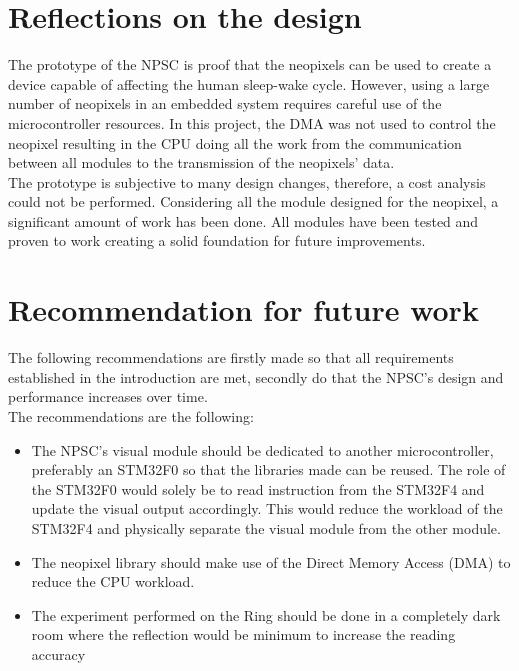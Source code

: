 \section{Reflections on the design}
The prototype of the NPSC is proof that the neopixels can be used to create a device capable of affecting the human sleep-wake cycle. However, using a large number of neopixels in an embedded system requires careful use of the microcontroller resources. In this project, the DMA was not used to control the neopixel resulting in the CPU doing all the work from the communication between all modules to the transmission of the neopixels' data. \\
The prototype is subjective to many design changes, therefore, a cost analysis could not be performed. Considering all the module designed for the neopixel, a significant amount of work has been done. All modules have been tested and proven to work creating a solid foundation for future improvements. 

\section{Recommendation for future work}
The following recommendations are firstly made so that all requirements established in the introduction are met, secondly do that the NPSC's design and performance increases over time.\\
The recommendations are the following:
\begin{itemize}
	\item The NPSC's visual module should be dedicated to another microcontroller, preferably an STM32F0 so that the libraries made can be reused. The role of the STM32F0 would solely be to read instruction from the STM32F4 and update the visual output accordingly. This would reduce the workload of the STM32F4 and physically separate the visual module from the other module. 
	\item The neopixel library should make use of the Direct Memory Access (DMA) to reduce the CPU workload.
	\item The experiment performed on the Ring should be done in a completely dark room where the reflection would be minimum to increase the reading accuracy
\end{itemize}